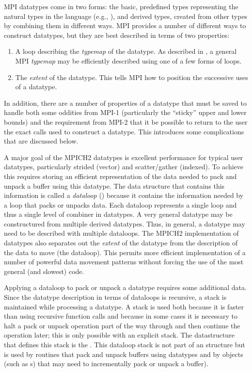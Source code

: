 \documentclass{article}
\begin{document}
MPI datatypes come in two forms: the basic, predefined types representing the
natural types in the language (e.g., ), and derived types,
created from other types by combining them in different ways.  MPI provides a
number of different ways to construct datatypes, but they are best described
in terms of two properties:
\begin{enumerate}
\item A loop describing the \emph{typemap} of the datatype.  As described in
  \cite{gropp-swider-lusk99}, a general MPI \emph{typemap} may be efficiently
  described using one of a few forms of loops.
\item The \emph{extent} of the datatype.  This tells MPI how to position the
  successive uses of a datatype.
\end{enumerate}
In addition, there are a number of properties of a datatype that must be saved
to handle both some oddities from MPI-1 (particularly the ``sticky'' upper and
lower bounds) and the requirement from MPI-2 that it be possible to return to
the user the exact calls used to construct a datatype.  This introduces some
complications that are discussed below.

A major goal of the MPICH2 datatypes is excellent performance for typical user
datatypes, particularly strided (vector) and scatter/gather (indexed).  To
achieve this requires storing an efficient representation of the data needed
to pack and unpack a buffer using this datatype.  The data structure that
contains this information is called a \emph{dataloop}
() because it contains the information needed by a
loop that packs or unpacks data.  Each dataloop represents a single loop and
thus a single level of combiner in datatypes.  A very general datatype may be
constructured from multiple derived datatypes.  Thus, in general, a datatype
may need to be described with multiple dataloops.  
The MPICH2 implementation of datatypes also separates out the \emph{extent} of
the datatype from the description of the data to move (the dataloop).  This
permits more efficient implementation of a number of powerful data movement
patterns without forcing the use of the most general (and slowest) code.

Applying a dataloop to pack or unpack a datatype requires some additional
data.  Since the datatype description in terms of dataloops is recursive, a
stack is maintained while processing a datatype.  A stack is used both because
it is faster than using recursive function calls and because in some cases it
is necessary to halt a pack or unpack operation part of the way through and
then continue the operation later; this is only possible with an explicit
stack.   The datastructure that defines this stack is the
.  This dataloop stack is not part of an
 structure but is used by routines that pack and unpack
buffers using datatypes and by objects (such as s)
that may need to incrementally pack or unpack a buffer).
\end{document}

